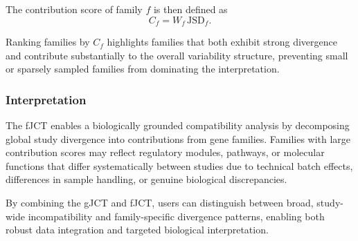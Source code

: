 The contribution score of family $f$ is then defined as
\[
C_f = W_f \, \mathrm{JSD}_f.
\]

Ranking families by $C_f$ highlights families that both exhibit strong divergence and contribute substantially to the overall variability structure, preventing small or sparsely sampled families from dominating the interpretation.

\subsubsection{Interpretation}

The fJCT enables a biologically grounded compatibility analysis by decomposing global study divergence into contributions from gene families. Families with large contribution scores may reflect regulatory modules, pathways, or molecular functions that differ systematically between studies due to technical batch effects, differences in sample handling, or genuine biological discrepancies.

By combining the gJCT and fJCT, users can distinguish between broad, study-wide incompatibility and family-specific divergence patterns, enabling both robust data integration and targeted biological interpretation.
